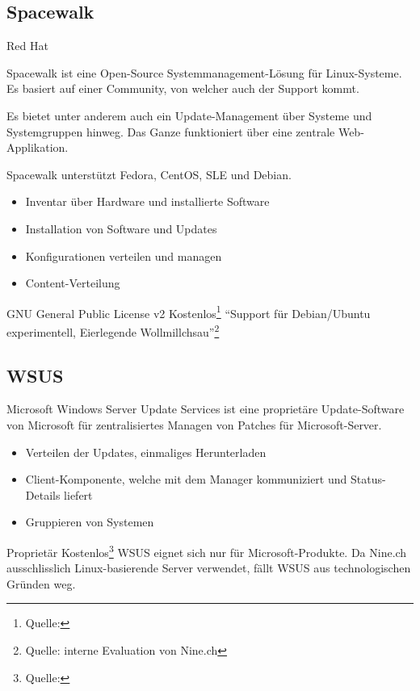 \subsection{Spacewalk}

{Red Hat}
{Spacewalk ist eine Open-Source Systemmanagement-Lösung für Linux-Systeme. Es basiert auf einer Community, von welcher auch der Support kommt.

Es bietet unter anderem auch ein Update-Management über Systeme und Systemgruppen hinweg. Das Ganze funktioniert über eine zentrale Web-Applikation.

Spacewalk unterstützt Fedora, CentOS, SLE und Debian.}
{\begin{itemize}
\item Inventar über Hardware und installierte Software
\item Installation von Software und Updates
\item Konfigurationen verteilen und managen
\item Content-Verteilung
\end{itemize}}
{GNU General Public License v2}
{Kostenlos\footnote{Quelle: }}
{}
{``Support für Debian/Ubuntu experimentell, Eierlegende Wollmillchsau''\footnote{Quelle: interne Evaluation von Nine.ch}}

\subsection{WSUS}

{Microsoft}
{Windows Server Update Services ist eine proprietäre Update-Software von Microsoft für zentralisiertes Managen von Patches für Microsoft-Server.}
{\begin{itemize}
\item Verteilen der Updates, einmaliges Herunterladen
\item Client-Komponente, welche mit dem Manager kommuniziert und Status-Details liefert
\item Gruppieren von Systemen
\end{itemize}}
{Proprietär}
{Kostenlos\footnote{Quelle: }}
{}
{WSUS eignet sich nur für Microsoft-Produkte. Da Nine.ch ausschlisslich Linux-basierende Server verwendet, fällt WSUS aus technologischen Gründen weg.}

